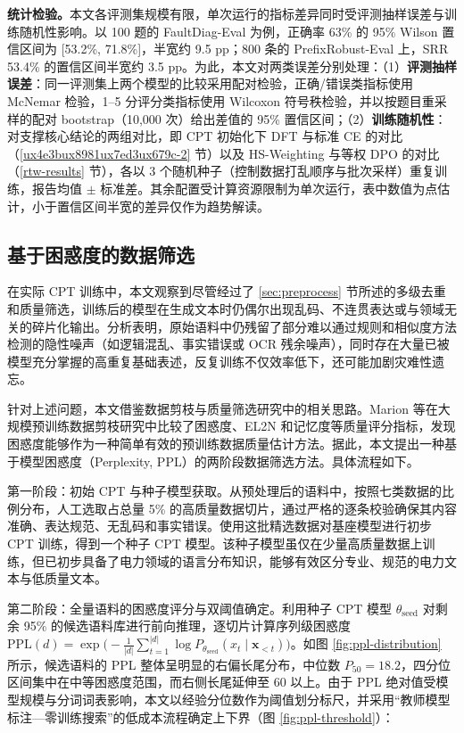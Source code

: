 \documentclass[fontset=fandol,type=master,campus=shenzhen,etitleauto=true]{hithesisbook}
\begin{document}
\textbf{统计检验。}本文各评测集规模有限，单次运行的指标差异同时受评测抽样误差与训练随机性影响。以 100 题的 FaultDiag-Eval 为例，正确率 63\% 的 95\% Wilson 置信区间为 [53.2\%, 71.8\%]，半宽约 9.5 pp；800 条的 PrefixRobust-Eval 上，SRR 53.4\% 的置信区间半宽约 3.5 pp。为此，本文对两类误差分别处理：（1）\textbf{评测抽样误差}：同一评测集上两个模型的比较采用配对检验，正确/错误类指标使用 McNemar 检验，1--5 分评分类指标使用 Wilcoxon 符号秩检验，并以按题目重采样的配对 bootstrap（10{,}000 次）给出差值的 95\% 置信区间；（2）\textbf{训练随机性}：对支撑核心结论的两组对比，即 CPT 初始化下 DFT 与标准 CE 的对比（\ref{ux4e3bux8981ux7ed3ux679c-2} 节）以及 HS-Weighting 与等权 DPO 的对比（\ref{rtw-results} 节），各以 3 个随机种子（控制数据打乱顺序与批次采样）重复训练，报告均值 $\pm$ 标准差。其余配置受计算资源限制为单次运行，表中数值为点估计，小于置信区间半宽的差异仅作为趋势解读。

\subsection{基于困惑度的数据筛选}\label{ux57faux4e8eux56f0ux60d1ux5ea6ux7684ux6570ux636eux7b5bux9009}

在实际 CPT 训练中，本文观察到尽管经过了 \ref{sec:preprocess} 节所述的多级去重和质量筛选，训练后的模型在生成文本时仍偶尔出现乱码、不连贯表达或与领域无关的碎片化输出。分析表明，原始语料中仍残留了部分难以通过规则和相似度方法检测的隐性噪声（如逻辑混乱、事实错误或 OCR 残余噪声），同时存在大量已被模型充分掌握的高重复基础表述，反复训练不仅效率低下，还可能加剧灾难性遗忘。

针对上述问题，本文借鉴数据剪枝与质量筛选研究中的相关思路。Marion 等在大规模预训练数据剪枝研究中比较了困惑度、EL2N 和记忆度等质量评分指标，发现困惑度能够作为一种简单有效的预训练数据质量估计方法\cite{ref58}。据此，本文提出一种基于模型困惑度（Perplexity, PPL）的两阶段数据筛选方法。具体流程如下。

第一阶段：初始 CPT 与种子模型获取。从预处理后的语料中，按照七类数据的比例分布，人工选取占总量 5\% 的高质量数据切片，通过严格的逐条校验确保其内容准确、表达规范、无乱码和事实错误。使用这批精选数据对基座模型进行初步 CPT 训练，得到一个种子 CPT 模型。该种子模型虽仅在少量高质量数据上训练，但已初步具备了电力领域的语言分布知识，能够有效区分专业、规范的电力文本与低质量文本。

第二阶段：全量语料的困惑度评分与双阈值确定。利用种子 CPT 模型 $\theta_{\text{seed}}$ 对剩余 95\% 的候选语料库进行前向推理，逐切片计算序列级困惑度 $\text{PPL}(d) = \exp\bigl(-\frac{1}{|d|}\sum_{t=1}^{|d|} \log P_{\theta_{\text{seed}}}(x_t \mid \mathbf{x}_{<t})\bigr)$。如图 \ref{fig:ppl-distribution} 所示，候选语料的 PPL 整体呈明显的右偏长尾分布，中位数 $P_{50} = 18.2$，四分位区间集中在中等困惑度范围，而右侧长尾延伸至 $60$ 以上。由于 PPL 绝对值受模型规模与分词词表影响，本文以经验分位数作为阈值划分标尺，并采用“教师模型标注—零训练搜索”的低成本流程确定上下界（图 \ref{fig:ppl-threshold}）：
\end{document}
